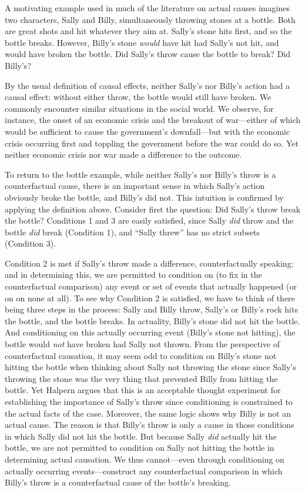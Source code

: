 \documentclass[12pt,]{book}
\begin{document}
A motivating example used in much of the literature on actual causes \citep[e.g.~][]{hall2004two} imagines two characters, Sally and Billy, simultaneously throwing stones at a bottle. Both are great shots and hit whatever they aim at. Sally's stone hits first, and so the bottle breaks. However, Billy's stone \emph{would} have hit had Sally's not hit, and would have broken the bottle. Did Sally's throw cause the bottle to break? Did Billy's?

By the usual definition of causal effects, neither Sally's nor Billy's action had a causal effect: without either throw, the bottle would still have broken. We commonly encounter similar situations in the social world. We observe, for instance, the onset of an economic crisis and the breakout of war---either of which would be sufficient to cause the government's downfall---but with the economic crisis occurring first and toppling the government before the war could do so. Yet neither economic crisis nor war made a difference to the outcome.

To return to the bottle example, while neither Sally's nor Billy's throw is a counterfactual cause, there is an important sense in which Sally's action obviously broke the bottle, and Billy's did not. This intuition is confirmed by applying the definition above. Consider first the question: Did Sally's throw break the bottle? Conditions 1 and 3 are easily satisfied, since Sally \emph{did} throw and the bottle \emph{did} break (Condition 1), and ``Sally threw'' has no strict subsets (Condition 3).

Condition 2 is met if Sally's throw made a difference, counterfactually speaking; and in determining this, we are permitted to condition on (to fix in the counterfactual comparison) any event or set of events that actually happened (or on on none at all). To see why Condition 2 is satisfied, we have to think of there being three steps in the process: Sally and Billy throw, Sally's or Billy's rock hits the bottle, and the bottle breaks. In actuality, Billy's stone did not hit the bottle. And conditioning on this actually occurring event (Billy's stone not hitting), the bottle would \emph{not} have broken had Sally not thrown. From the perspective of counterfactual causation, it may seem odd to condition on Billy's stone not hitting the bottle when thinking about Sally not throwing the stone since Sally's throwing the stone was the very thing that prevented Billy from hitting the bottle. Yet Halpern argues that this is an acceptable thought experiment for establishing the importance of Sally's throw since conditioning is constrained to the actual facts of the case. Moreover, the same logic shows why Billy is not an actual cause. The reason is that Billy's throw is only a cause in those conditions in which Sally did not hit the bottle. But because Sally \emph{did} actually hit the bottle, we are not permitted to condition on Sally not hitting the bottle in determining actual causation. We thus cannot---even through conditioning on actually occurring events---construct any counterfactual comparison in which Billy's throw is a counterfactual cause of the bottle's breaking.
\end{document}
